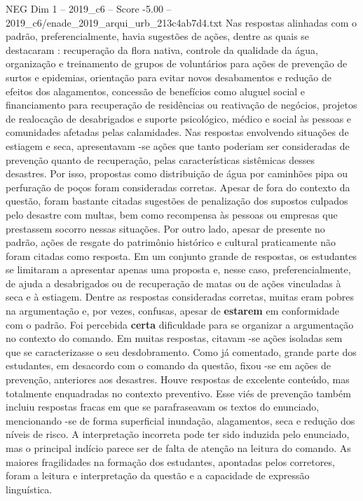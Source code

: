 \begin{textsample}{NEG Dim 1 – 2019\_c6 – Score -5.00 – 2019\_c6/enade\_2019\_arqui\_urb\_213c4ab7d4.txt}
Nas respostas alinhadas com o padrão, preferencialmente, havia sugestões de ações, dentre as quais se destacaram : recuperação da flora nativa, controle da qualidade da água, organização e treinamento de grupos de voluntários para ações de prevenção de surtos e epidemias, orientação para evitar novos desabamentos e redução de efeitos dos alagamentos, concessão de benefícios como aluguel social e financiamento para recuperação de residências ou reativação de negócios, projetos de realocação de desabrigados e suporte psicológico, médico e social às pessoas e comunidades afetadas pelas calamidades.
Nas respostas envolvendo situações de estiagem e seca, apresentavam -se ações que tanto poderiam ser consideradas de prevenção quanto de recuperação, pelas características sistêmicas desses desastres.
Por isso, propostas como distribuição de água por caminhões pipa ou perfuração de poços foram consideradas corretas.
Apesar de fora do contexto da questão, foram bastante citadas sugestões de penalização dos supostos culpados pelo desastre com multas, bem como recompensa às pessoas ou empresas que prestassem socorro nessas situações.
Por outro lado, apesar de presente no padrão, ações de resgate do patrimônio histórico e cultural praticamente não foram citadas como resposta.
Em um conjunto grande de respostas, os estudantes se limitaram a apresentar apenas uma proposta e, nesse caso, preferencialmente, de ajuda a desabrigados ou de recuperação de matas ou de ações vinculadas à seca e à estiagem.
Dentre as respostas consideradas corretas, muitas eram pobres na argumentação e, por vezes, confusas, apesar de \textbf{estarem} em conformidade com o padrão.
Foi percebida \textbf{certa} dificuldade para se organizar a argumentação no contexto do comando.
Em muitas respostas, citavam -se ações isoladas sem que se caracterizasse o seu desdobramento.
Como já comentado, grande parte dos estudantes, em desacordo com o comando da questão, fixou -se em ações de prevenção, anteriores aos desastres.
Houve respostas de excelente conteúdo, mas totalmente enquadradas no contexto preventivo.
Esse viés de prevenção também incluiu respostas fracas em que se parafraseavam os textos do enunciado, mencionando -se de forma superficial inundação, alagamentos, seca e redução dos níveis de risco.
A interpretação incorreta pode ter sido induzida pelo enunciado, mas o principal indício parece ser de falta de atenção na leitura do comando.
As maiores fragilidades na formação dos estudantes, apontadas pelos corretores, foram a leitura e interpretação da questão e a capacidade de expressão linguística.

\end{textsample}
